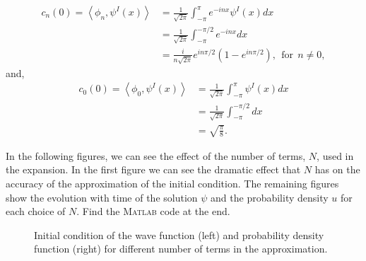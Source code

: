 \begin{questions}
\begin{solution}
\begin{align*}
c_n(0) = \left\langle\phi_n,\psi^I(x)\right\rangle &= \frac{1}{\sqrt{2\pi}}\int_{-\pi}^{\pi}e^{-inx}\psi^I(x)dx\\
&= \frac{1}{\sqrt{2\pi}}\int_{-\pi}^{-\pi/2}e^{-inx}dx\\
&= \frac{i}{n\sqrt{2\pi}}e^{in\pi/2}\left(1-e^{in\pi/2}\right), ~~\text{for}~~ n\neq 0,
\end{align*}
and, 
\begin{align*}
c_0(0) = \left\langle\phi_0,\psi^I(x)\right\rangle &= \frac{1}{\sqrt{2\pi}}\int_{-\pi}^{\pi}\psi^I(x)dx\\
&= \frac{1}{\sqrt{2\pi}}\int_{-\pi}^{-\pi/2}dx\\
&= \sqrt{\frac{\pi}{8}}.
\end{align*}

In the following figures, we can see the effect of the number of terms, $N$, used in the expansion. In the first figure we can see the dramatic effect that $N$ has on the accuracy of the approximation of the initial condition. The remaining figures show the evolution with time of the solution $\psi$ and the probability density $u$ for each choice of $N$. Find the \textsc{Matlab} code at the end.

\newpage

\begin{figure}[H]
\centering     %
{}
\hspace{-0.6cm}

\hspace{-0.6cm}

\hspace{-0.9cm}
\caption{Initial condition of the wave function (left) and probability density function (right) for different number of terms in the approximation.}
\end{figure}

\begin{figure}[H]
\centering     %
{}
\hspace{-0.6cm}


\end{figure}
\end{solution}
\end{questions}
